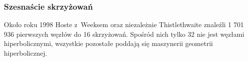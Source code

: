 
\subsubsection{Szesnaście skrzyżowań}
Około roku 1998 Hoste z~Weeksem \cite{thistlethwaite1998} oraz niezależnie Thistlethwaite znaleźli 1 701 936 pierwszych węzłów do 16 skrzyżowań.
%
%
%
Spośród nich tylko 32 nie jest węzłami hiperbolicznymi, wszystkie pozostałe poddają się maszynerii geometrii hiperbolicznej.

